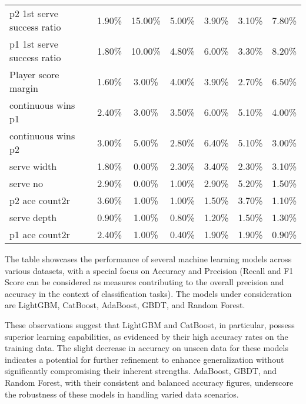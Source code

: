 \documentclass{mcmthesis}
\begin{document}
\begin{table}[h!]
{\begin{tabular}{lcccccc}
            p2 1st serve success ratio      & 1.90\%      & 15.00\%           & 5.00\%        & 3.90\%            & 3.10\%           & 7.80\%            \\
            p1 1st serve success ratio      & 1.80\%      & 10.00\%           & 4.80\%        & 6.00\%            & 3.30\%           & 8.20\%            \\
            Player score margin             & 1.60\%      & 3.00\%            & 4.00\%        & 3.90\%            & 2.70\%           & 6.50\%            \\
            continuous wins p1              & 2.40\%      & 3.00\%            & 3.50\%        & 6.00\%            & 5.10\%           & 4.00\%            \\
            continuous wins p2              & 3.00\%      & 5.00\%            & 2.80\%        & 6.40\%            & 5.10\%           & 3.00\%            \\
            serve width                     & 1.80\%      & 0.00\%            & 2.30\%        & 3.40\%            & 2.30\%           & 3.10\%            \\
            serve no                        & 2.90\%      & 0.00\%            & 1.00\%        & 2.90\%            & 5.20\%           & 1.50\%            \\
            p2 ace count2r                  & 3.60\%      & 1.00\%            & 1.00\%        & 1.50\%            & 3.70\%           & 1.10\%            \\
            serve depth                     & 0.90\%      & 1.00\%            & 0.80\%        & 1.20\%            & 1.50\%           & 1.30\%            \\
            p1 ace count2r                  & 2.40\%      & 1.00\%            & 0.40\%        & 1.90\%            & 1.90\%           & 0.90\%            \\
            \hline
        \end{tabular}
    }
    \label{table:Feature importance in different models}
\end{table}
The table showcases the performance of several machine learning models across various datasets, with a special focus on Accuracy and Precision (Recall and F1 Score can be considered as measures contributing to the overall precision and accuracy in the context of classification tasks). The models under consideration are LightGBM, CatBoost, AdaBoost, GBDT, and Random Forest.

These observations suggest that LightGBM and CatBoost, in particular, possess superior learning capabilities, as evidenced by their high accuracy rates on the training data. The slight decrease in accuracy on unseen data for these models indicates a potential for further refinement to enhance generalization without significantly compromising their inherent strengths. AdaBoost, GBDT, and Random Forest, with their consistent and balanced accuracy figures, underscore the robustness of these models in handling varied data scenarios.
\end{document}
